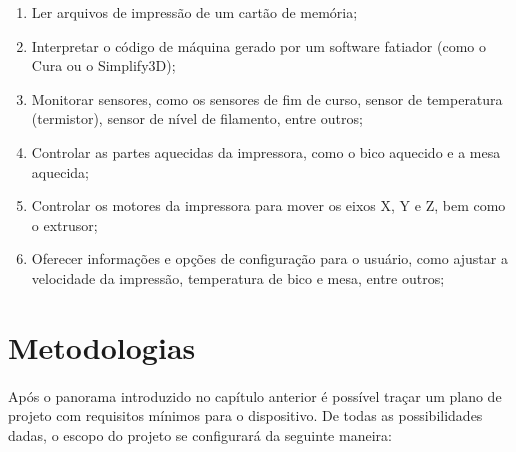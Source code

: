 \documentclass[12pt, english]{article}
\begin{document}
\begin{enumerate}
	\item {
		Ler arquivos de impressão de um cartão de memória;
	}
	\item {
		Interpretar o código de máquina gerado por um software fatiador (como o Cura ou o Simplify3D);
		}
	\item {
		Monitorar sensores, como os sensores de fim de curso, sensor de temperatura (termistor), sensor de nível de filamento, entre outros;
	}
	\item {
		Controlar as partes aquecidas da impressora, como o bico aquecido e a mesa aquecida;
		}
	\item {
		Controlar os motores da impressora para mover os eixos X, Y e Z, bem como o extrusor;
	}
	\item {
		Oferecer informações e opções de configuração para o usuário, como ajustar a velocidade da impressão, temperatura de bico e mesa, entre outros;
	}
\end{enumerate}


\pagebreak
\section{Metodologias}

\paragraph{}
Após o panorama introduzido no capítulo anterior é possível traçar um plano de projeto com requisitos mínimos para o dispositivo. De todas as possibilidades dadas, o escopo do projeto se configurará da seguinte maneira:
\end{document}
